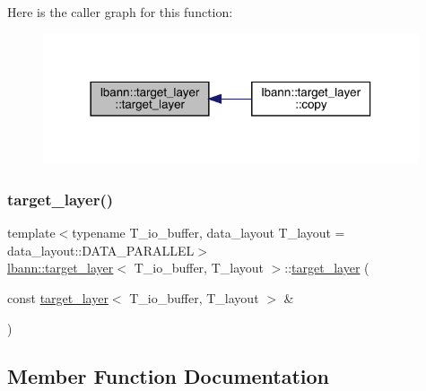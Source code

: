 Here is the caller graph for this function\+:\nopagebreak
\begin{figure}[H]
\begin{center}
\leavevmode
\includegraphics[width=314pt]{classlbann_1_1target__layer_ab06729051345c739c33ea445ceed100a_icgraph}
\end{center}
\end{figure}
\mbox{\label{classlbann_1_1target__layer_a71d286715ce29b557e1554a5b9b64b51}} 
\subsubsection{\texorpdfstring{target\+\_\+layer()}{target\_layer()}\hspace{0.1cm}{\footnotesize\ttfamily [2/2]}}
{\footnotesize\ttfamily template$<$typename T\+\_\+io\+\_\+buffer, data\+\_\+layout T\+\_\+layout = data\+\_\+layout\+::\+D\+A\+T\+A\+\_\+\+P\+A\+R\+A\+L\+L\+EL$>$ \\
\hyperlink{classlbann_1_1target__layer}{lbann\+::target\+\_\+layer}$<$ T\+\_\+io\+\_\+buffer, T\+\_\+layout $>$\+::\hyperlink{classlbann_1_1target__layer}{target\+\_\+layer} (\begin{DoxyParamCaption}\item[{const \hyperlink{classlbann_1_1target__layer}{target\+\_\+layer}$<$ T\+\_\+io\+\_\+buffer, T\+\_\+layout $>$ \&}]{ }\end{DoxyParamCaption})\hspace{0.3cm}{\ttfamily [default]}}



\subsection{Member Function Documentation}
\mbox{\label{classlbann_1_1target__layer_a7cff9e162514ee6c8be9803ba3902fca}} 

